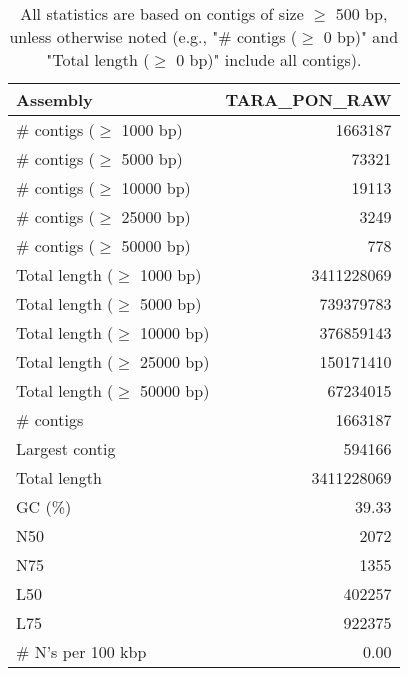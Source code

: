 \documentclass[12pt,a4paper]{article}
\begin{document}
\begin{table}[ht]
\begin{center}
\caption{All statistics are based on contigs of size $\geq$ 500 bp, unless otherwise noted (e.g., "\# contigs ($\geq$ 0 bp)" and "Total length ($\geq$ 0 bp)" include all contigs).}
\begin{tabular}{|l*{1}{|r}|}
\hline
Assembly & TARA\_PON\_RAW \\ \hline
\# contigs ($\geq$ 1000 bp) & 1663187 \\ \hline
\# contigs ($\geq$ 5000 bp) & 73321 \\ \hline
\# contigs ($\geq$ 10000 bp) & 19113 \\ \hline
\# contigs ($\geq$ 25000 bp) & 3249 \\ \hline
\# contigs ($\geq$ 50000 bp) & 778 \\ \hline
Total length ($\geq$ 1000 bp) & 3411228069 \\ \hline
Total length ($\geq$ 5000 bp) & 739379783 \\ \hline
Total length ($\geq$ 10000 bp) & 376859143 \\ \hline
Total length ($\geq$ 25000 bp) & 150171410 \\ \hline
Total length ($\geq$ 50000 bp) & 67234015 \\ \hline
\# contigs & 1663187 \\ \hline
Largest contig & 594166 \\ \hline
Total length & 3411228069 \\ \hline
GC (\%) & 39.33 \\ \hline
N50 & 2072 \\ \hline
N75 & 1355 \\ \hline
L50 & 402257 \\ \hline
L75 & 922375 \\ \hline
\# N's per 100 kbp & 0.00 \\ \hline
\end{tabular}
\end{center}
\end{table}
\end{document}
